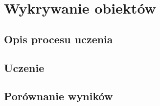 \chapter{Wykrywanie obiektów}
\section{Opis procesu uczenia}
\section{Uczenie}
\section{Porównanie wyników}
